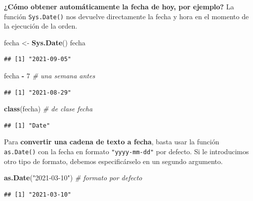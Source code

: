 \documentclass[11pt,]{book}
\newenvironment{Shaded}{\begin{snugshade}}{\end{snugshade}}
\newcommand{\CommentTok}[1]{\textcolor[rgb]{0.37,0.37,0.37}{\textit{#1}}}
\newcommand{\DecValTok}[1]{\textcolor[rgb]{0.06,0.06,0.06}{#1}}
\newcommand{\KeywordTok}[1]{\textcolor[rgb]{0.27,0.27,0.27}{\textbf{#1}}}
\newcommand{\NormalTok}[1]{#1}
\newcommand{\OperatorTok}[1]{\textcolor[rgb]{0.43,0.43,0.43}{\textbf{#1}}}
\newcommand{\StringTok}[1]{\textcolor[rgb]{0.5,0.5,0.5}{#1}}
\begin{document}
\textbf{¿Cómo obtener automáticamente la fecha de hoy, por ejemplo?} La función \texttt{Sys.Date()} nos devuelve directamente la fecha y hora en el momento de la ejecución de la orden.

\begin{Shaded}
\begin{Highlighting}[]
\NormalTok{fecha <-}\StringTok{ }\KeywordTok{Sys.Date}\NormalTok{()}
\NormalTok{fecha}
\end{Highlighting}
\end{Shaded}

\begin{verbatim}
## [1] "2021-09-05"
\end{verbatim}

\begin{Shaded}
\begin{Highlighting}[]
\NormalTok{fecha }\OperatorTok{-}\StringTok{ }\DecValTok{7} \CommentTok{# una semana antes}
\end{Highlighting}
\end{Shaded}

\begin{verbatim}
## [1] "2021-08-29"
\end{verbatim}

\begin{Shaded}
\begin{Highlighting}[]
\KeywordTok{class}\NormalTok{(fecha) }\CommentTok{# de clase fecha}
\end{Highlighting}
\end{Shaded}

\begin{verbatim}
## [1] "Date"
\end{verbatim}

Para \textbf{convertir una cadena de texto a fecha}, basta usar la función \texttt{as.Date()} con la fecha en formato \texttt{"yyyy-mm-dd"} por defecto. Si le introducimos otro tipo de formato, debemos especificárselo en un segundo argumento.

\begin{Shaded}
\begin{Highlighting}[]
\KeywordTok{as.Date}\NormalTok{(}\StringTok{"2021-03-10"}\NormalTok{) }\CommentTok{# formato por defecto}
\end{Highlighting}
\end{Shaded}

\begin{verbatim}
## [1] "2021-03-10"
\end{verbatim}
\end{document}
